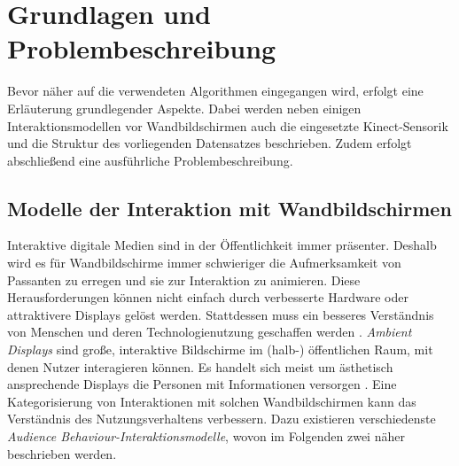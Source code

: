 \chapter{Grundlagen und Problembeschreibung}
\label{chapter2}
Bevor näher auf die verwendeten Algorithmen eingegangen wird,
erfolgt eine Erläuterung grundlegender Aspekte.
Dabei werden neben einigen Interaktionsmodellen vor Wandbildschirmen
auch die eingesetzte Kinect-Sensorik und die Struktur des vorliegenden Datensatzes beschrieben.
Zudem erfolgt abschließend eine ausführliche Problembeschreibung.

\section{Modelle der Interaktion mit Wandbildschirmen}
\label{2-ModelleInteraktion-Wandbildschirme}
Interaktive digitale Medien sind in der Öffentlichkeit immer präsenter.
Deshalb wird es für Wandbildschirme immer schwieriger die Aufmerksamkeit von Passanten zu erregen
und sie zur Interaktion zu animieren.
Diese Herausforderungen können nicht einfach durch verbesserte Hardware oder attraktivere Displays gelöst werden.
Stattdessen muss ein besseres Verständnis von Menschen und deren Technologienutzung geschaffen werden \citep{wouters_uncovering_2016}.
\emph{Ambient Displays} sind große, interaktive Bildschirme im (halb-) öffentlichen Raum, mit denen Nutzer interagieren können.
Es handelt sich meist um ästhetisch ansprechende Displays die Personen mit Informationen versorgen \citep{mankoff_heuristic_2003}.
Eine Kategorisierung von Interaktionen mit solchen Wandbildschirmen kann das Verständnis des Nutzungsverhaltens verbessern.
Dazu existieren verschiedenste \emph{Audience Behaviour-Interaktionsmodelle}, wovon im Folgenden zwei näher beschrieben werden.

